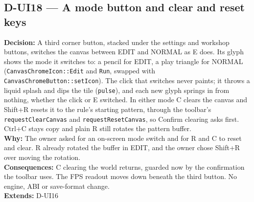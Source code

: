 \subsection*{D-UI18 --- A mode button and clear and reset keys}
\begin{decisionbox}[title={D-UI18 \quad 2026-10-03}]
\textbf{Decision:} A third corner button, stacked under the settings and
workshop buttons, switches the canvas between EDIT and NORMAL as E does. Its
glyph shows the mode it switches to: a pencil for EDIT, a play triangle for
NORMAL (\texttt{CanvasChromeIcon::Edit} and \texttt{Run}, swapped with
\texttt{CanvasChromeButton::setIcon}). The click that switches never paints;
it throws a liquid splash and dips the tile (\texttt{pulse}), and each new
glyph springs in from nothing, whether the click or E switched.
In either mode C clears the canvas and Shift+R resets it to the rule's
starting pattern, through the toolbar's \texttt{requestClearCanvas} and
\texttt{requestResetCanvas}, so Confirm clearing asks first. Ctrl+C stays
copy and plain R still rotates the pattern buffer.\\
\textbf{Why:} The owner asked for an on-screen mode switch and for R and C to
reset and clear. R already rotated the buffer in EDIT, and the owner chose
Shift+R over moving the rotation.\\
\textbf{Consequences:} C clearing the world returns, guarded now by the
confirmation the toolbar uses. The FPS readout moves down beneath the third
button. No engine, ABI or save-format change.\\
\textbf{Extends:} D-UI16
\end{decisionbox}

